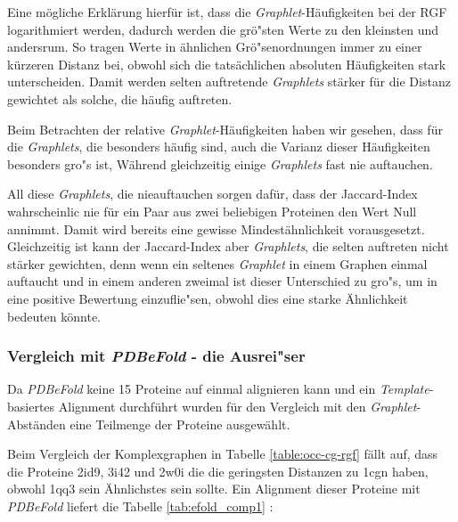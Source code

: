 \documentclass{report}
\begin{document}
Eine m\"ogliche Erkl\"arung hierf\"ur ist, dass die \textit{Graphlet}-H\"aufigkeiten bei der RGF logarithmiert werden, dadurch werden die gr\"o"sten Werte zu den kleinsten und andersrum.
So tragen Werte in \"ahnlichen Gr\"o"senordnungen immer zu einer k\"urzeren Distanz bei, obwohl sich die tats\"achlichen absoluten H\"aufigkeiten stark unterscheiden. Damit werden selten auftretende \textit{Graphlets} st\"arker f\"ur die Distanz gewichtet als solche, die h\"aufig auftreten. 



Beim Betrachten der relative \textit{Graphlet}-H\"aufigkeiten haben wir gesehen, dass f\"ur die \textit{Graphlets}, die besonders h\"aufig sind, auch die Varianz dieser H\"aufigkeiten besonders gro"s ist, W\"ahrend gleichzeitig einige \textit{Graphlets} fast nie auftauchen.

All diese \textit{Graphlets}, die nieauftauchen sorgen daf\"ur, dass der Jaccard-Index wahrscheinlic nie f\"ur ein Paar aus zwei beliebigen Proteinen den Wert Null annimmt. Damit wird bereits eine gewisse Mindest\"ahnlichkeit vorausgesetzt. Gleichzeitig ist kann der Jaccard-Index aber \textit{Graphlets}, die selten auftreten nicht st\"arker gewichten, denn wenn ein seltenes \textit{Graphlet} in einem Graphen einmal auftaucht und in einem anderen zweimal ist dieser Unterschied zu gro"s, um in eine positive Bewertung einzuflie"sen, obwohl dies eine starke \"Ahnlichkeit bedeuten k\"onnte.

\subsubsection{Vergleich mit \textit{PDBeFold} - die Ausrei"ser}

Da \textit{PDBeFold} keine 15 Proteine auf einmal alignieren kann und ein \textit{Template}-basiertes Alignment durchf\"uhrt wurden f\"ur den Vergleich mit den \textit{Graphlet}-Abst\"anden eine Teilmenge der Proteine ausgew\"ahlt.


Beim Vergleich der Komplexgraphen in Tabelle \ref{table:occ-cg-rgf} f\"allt auf, dass die Proteine 2id9, 3i42 und 2w0i die die geringsten Distanzen zu 1cgn haben, obwohl 1qq3 sein \"Ahnlichstes sein sollte. Ein Alignment dieser Proteine mit \textit{PDBeFold} liefert die Tabelle \ref{tab:efold_comp1} :
\end{document}
